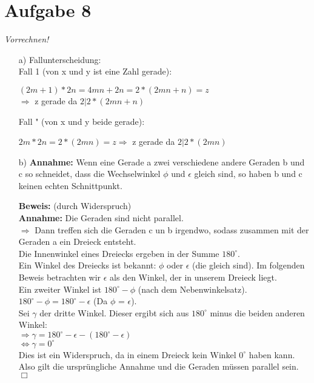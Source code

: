 \documentclass[paper = a4, ngerman]{scrartcl}
\begin{document}
\section*{Aufgabe 8}
\textit{Vorrechnen!}
	\begin{itemize}
		\item[a)] Fallunterscheidung:\\
		Fall 1 (von x und y ist eine Zahl gerade):
		\begin{center}
			$(2m + 1) * 2n = 4mn + 2n = 2*(2mn + n) = z $\\$\Rightarrow$ z gerade da $2|2*(2mn + n)$
		\end{center}
		Fall " (von x und y beide gerade):
		\begin{center}
			$2m * 2n = 2*(2mn) = z \Rightarrow$ z gerade da $2|2*(2mn)$
		\end{center}
	
		\item[b)]
		\textbf{Annahme:} Wenn eine Gerade a zwei verschiedene andere Geraden b und c so schneidet, dass die Wechselwinkel
		$\phi$ und $\epsilon$ gleich sind, so haben b und c keinen echten Schnittpunkt.
		
		\textbf{Beweis:} (durch Widerspruch)\\
		\textbf{Annahme:} Die Geraden sind nicht parallel.\\
		
		$\Rightarrow$ Dann treffen sich die Geraden c un b irgendwo, sodass zusammen mit der Geraden a ein Dreieck entsteht.\\
		
		Die Innenwinkel eines Dreiecks ergeben in der Summe $180^\circ$.\\
		
		Ein Winkel des Dreiecks ist bekannt: $\phi$ oder $\epsilon$ (die gleich sind). Im folgenden Beweis betrachten wir $\epsilon$ als den Winkel, der in unserem Dreieck liegt.\\
		Ein zweiter Winkel ist $180^\circ - \phi$ (nach dem Nebenwinkelsatz).\\ $180^\circ - \phi = 180^\circ - \epsilon$ (Da $\phi$ = $\epsilon$).\\
		
		Sei $\gamma$ der dritte Winkel. Dieser ergibt sich aus $180^\circ$ minus die beiden anderen Winkel:\\
		$\Rightarrow \gamma = 180^\circ - \epsilon - (180^\circ - \epsilon) $ \\
		$\Leftrightarrow \gamma = 0^\circ$\\
		
		Dies ist ein Widerspruch, da in einem Dreieck kein Winkel $0^\circ$ haben kann. Also gilt die ursprüngliche Annahme und die Geraden müssen parallel sein.
		\hfil$\Box$
	\end{itemize}
\pagebreak
\end{document}
